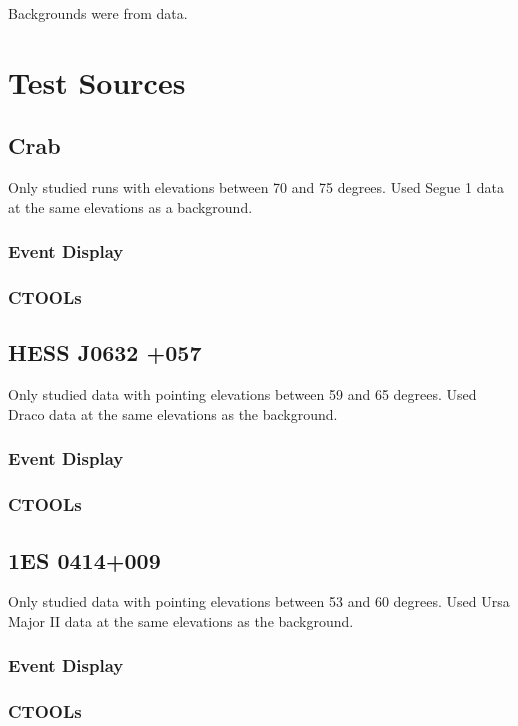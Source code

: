 Backgrounds were from data.

\section{Test Sources}

  \subsection{Crab}
    Only studied runs with elevations between 70 and 75 degrees.
    Used Segue 1 data at the same elevations as a background.

    \subsubsection{Event Display}
    \subsubsection{CTOOLs}

  \subsection{HESS J0632 +057}
    Only studied data with pointing elevations between 59 and 65 degrees.
    Used Draco data at the same elevations as the background.

    \subsubsection{Event Display}
    \subsubsection{CTOOLs}

  \subsection{1ES 0414+009}
    Only studied data with pointing elevations between 53 and 60 degrees.
    Used Ursa Major II data at the same elevations as the background.

    \subsubsection{Event Display}
    \subsubsection{CTOOLs}

